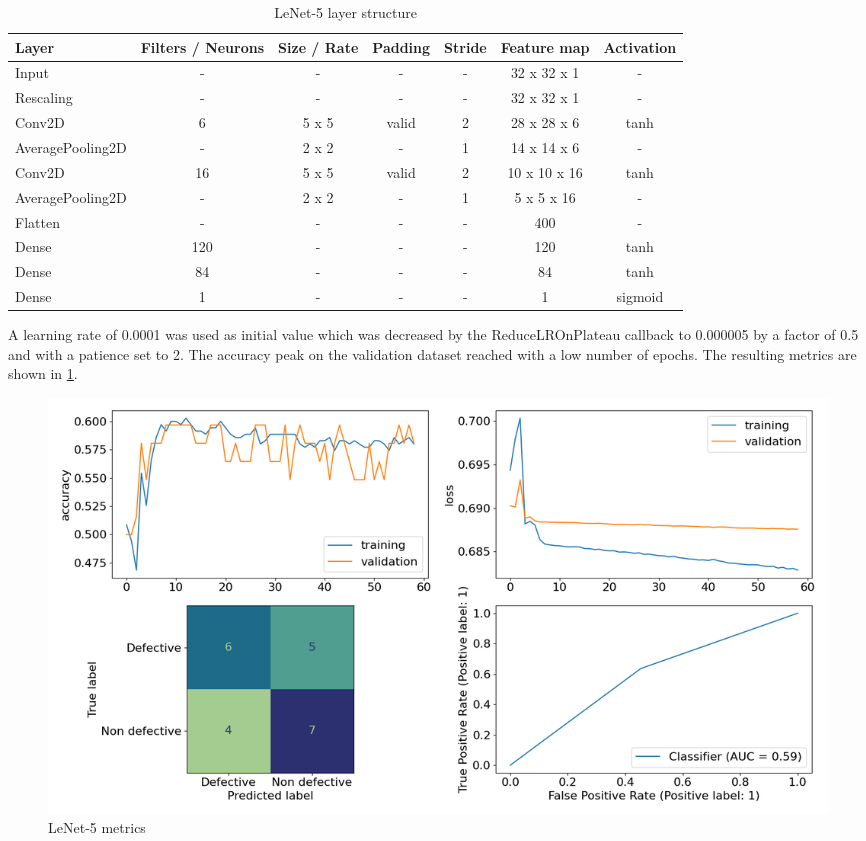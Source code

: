 \documentclass[10pt, final]{article}
\begin{document}
\begin{table}[!ht]
	\centering
	\begin{tabular}{l c c c c c c}
		Layer            & Filters / Neurons & Size / Rate & Padding & Stride & Feature map  & Activation \\
		\hline
		Input            & -                 & -           & -       & -      & 32 x 32 x 1  & -          \\
		Rescaling        & -                 & -           & -       & -      & 32 x 32 x 1  & -          \\
		Conv2D           & 6                 & 5 x 5       & valid   & 2      & 28 x 28 x 6  & tanh       \\
		AveragePooling2D & -                 & 2 x 2       & -       & 1      & 14 x 14 x 6  & -          \\
		Conv2D           & 16                & 5 x 5       & valid   & 2      & 10 x 10 x 16 & tanh       \\
		AveragePooling2D & -                 & 2 x 2       & -       & 1      & 5 x 5 x 16   & -          \\
		Flatten          & -                 & -           & -       & -      & 400          & -          \\
		Dense            & 120               & -           & -       & -      & 120          & tanh       \\
		Dense            & 84                & -           & -       & -      & 84           & tanh       \\
		Dense            & 1                 & -           & -       & -      & 1            & sigmoid    \\
		\hline
	\end{tabular}
	\caption{LeNet-5 layer structure}
	\label{table:LeNet5_struct}
\end{table}

A learning rate of 0.0001 was used as initial value which was decreased by the ReduceLROnPlateau callback to 0.000005 by
a factor of 0.5 and with a patience set to 2.
The accuracy peak on the validation dataset reached with a low number of epochs.
The resulting metrics are shown in \ref{fig:LeNet5_metrics}.

\begin{figure}[!ht]
	\centering
	\includegraphics[width=\textwidth]{./tex_graphs/metrics_LeNet-5.png}
	\caption{LeNet-5 metrics}
	\label{fig:LeNet5_metrics}
\end{figure}
\end{document}
